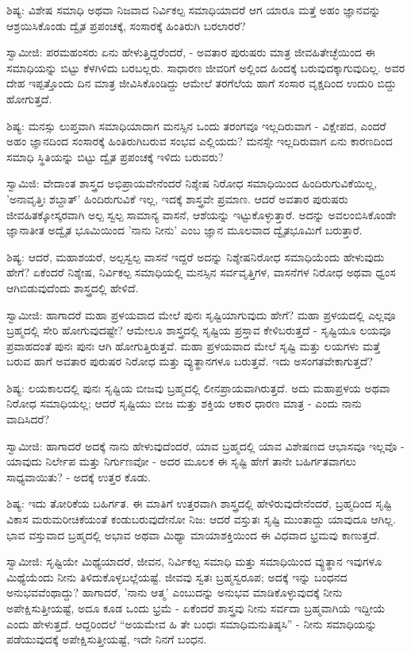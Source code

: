 ಶಿಷ್ಯ: ವಿಶೇಷ ಸಮಾಧಿ ಅಥವಾ ನಿಜವಾದ ನಿರ್ವಿಕಲ್ಪ ಸಮಾಧಿಯಾದರೆ ಆಗ ಯಾರೂ ಮತ್ತೆ ಅಹಂ ಜ್ಞಾನವನ್ನು ಆಶ್ರಯಿಸಿಕೊಂಡು ದ್ವೈತ ಪ್ರಪಂಚಕ್ಕೆ, ಸಂಸಾರಕ್ಕೆ ಹಿಂತಿರುಗಿ ಬರಲಾರರೆ?

ಸ್ವಾಮೀಜಿ: ಪರಮಹಂಸರು ಏನು ಹೇಳುತ್ತಿದ್ದರೆಂದರೆ, - ಅವತಾರ ಪುರುಷರು ಮಾತ್ರ ಜೀವಹಿತೇಚ್ಛೆಯಿಂದ ಈ ಸಮಾಧಿಯನ್ನು ಬಿಟ್ಟು ಕೆಳಗಿಳಿದು ಬರಬಲ್ಲರು. ಸಾಧಾರಣ ಜೀವರಿಗೆ ಅಲ್ಲಿಂದ ಹಿಂದಕ್ಕೆ ಬರುವುದಕ್ಕಾಗುವುದಿಲ್ಲ. ಅವರ ದೇಹ ಇಪ್ಪತ್ತೊಂದು ದಿನ ಮಾತ್ರ ಜೀವಿಸಿಕೊಂಡಿದ್ದು ಆಮೇಲೆ ತರಗೆಲೆಯ ಹಾಗೆ ಸಂಸಾರ ವೃಕ್ಷದಿಂದ ಉದುರಿ ಬಿದ್ದು ಹೋಗುತ್ತದೆ.

ಶಿಷ್ಯ: ಮನಸ್ಸು ಲುಪ್ತವಾಗಿ ಸಮಾಧಿಯಾದಾಗ ಮನಸ್ಸಿನ ಒಂದು ತರಂಗವೂ ಇಲ್ಲದಿರುವಾಗ - ವಿಕ್ಷೇಪದ, ಎಂದರೆ ಅಹಂ ಜ್ಞಾನದಿಂದ ಸಂಸಾರಕ್ಕೆ ಹಿಂತಿರುಗಿಬರುವ ಸಂಭವ ಎಲ್ಲಿಯದು? ಮನಸ್ಸೇ ಇಲ್ಲದಿರುವಾಗ ಏನು ಕಾರಣದಿಂದ ಸಮಾಧಿ ಸ್ಥಿತಿಯನ್ನು ಬಿಟ್ಟು ದ್ವೈತ ಪ್ರಪಂಚಕ್ಕೆ ಇಳಿದು ಬರುವರು?

ಸ್ವಾಮಿಜಿ: ವೇದಾಂತ ಶಾಸ್ತ್ರದ ಅಭಿಪ್ರಾಯವೇನೆಂದರೆ ನಿಶ್ಶೇಷ ನಿರೋಧ ಸಮಾಧಿಯಿಂದ ಹಿಂದಿರುಗುವಿಕೆಯಿಲ್ಲ, 'ಅನಾವೃತ್ತಿಃ ಶಬ್ದಾತ್' ಹಿಂದಿರುಗುವಿಕೆ ಇಲ್ಲ, ಇದಕ್ಕೆ ಶಾಸ್ತ್ರವೇ ಪ್ರಮಾಣ. ಆದರೆ ಅವತಾರ ಪುರುಷರು ಜೀವಹಿತಕ್ಕೋಸ್ಕರವಾಗಿ ಅಲ್ಪ ಸ್ವಲ್ಪ ಸಾಮಾನ್ಯ ವಾಸನೆ, ಆಶೆಯನ್ನು ಇಟ್ಟುಕೊಳ್ಳುತ್ತಾರೆ. ಅದನ್ನು ಅವಲಂಬಿಸಿಕೊಂಡೇ ಜ್ಞಾನಾತೀತ ಅದ್ವೈತ ಭೂಮಿಯಿಂದ 'ನಾನು ನೀನು' ಎಂಬ ಜ್ಞಾನ ಮೂಲವಾದ ದ್ವೈತಭೂಮಿಗೆ ಬರುತ್ತಾರೆ.

ಶಿಷ್ಯ: ಆದರೆ, ಮಹಾಶಯರೆ, ಅಲ್ಪಸ್ವಲ್ಪ ವಾಸನೆ ಇದ್ದರೆ ಅದನ್ನು ನಿಶ್ಶೇಷನಿರೋಧ ಸಮಾಧಿಯೆಂದು ಹೇಳುವುದು ಹೇಗೆ? ಏಕೆಂದರೆ ನಿಶ್ಶೇಷ, ನಿರ್ವಿಕಲ್ಪ ಸಮಾಧಿಯಲ್ಲಿ ಮನಸ್ಸಿನ ಸರ್ವವೃತ್ತಿಗಳ, ವಾಸನೆಗಳ ನಿರೋಧ ಅಥವಾ ಧ್ವಂಸ ಆಗಿಬಿಡುವುದೆಂದು ಶಾಸ್ತ್ರದಲ್ಲಿ ಹೇಳಿದೆ.

ಸ್ವಾಮೀಜಿ: ಹಾಗಾದರೆ ಮಹಾ ಪ್ರಳಯವಾದ ಮೇಲೆ ಪುನಃ ಸೃಷ್ಟಿಯಾಗುವುದು ಹೇಗೆ? ಮಹಾ ಪ್ರಳಯದಲ್ಲಿ ಎಲ್ಲವೂ ಬ್ರಹ್ಮದಲ್ಲಿ ಸೇರಿ ಹೋಗುವುದಷ್ಟೇ? ಆಮೇಲೂ ಶಾಸ್ತ್ರದಲ್ಲಿ ಸೃಷ್ಟಿಯ ಪ್ರಸ್ತಾವ ಕೇಳಿಬರುತ್ತದೆ - ಸೃಷ್ಟಿಯೂ ಲಯವೂ ಪ್ರವಾಹದಂತೆ ಪುನಃ ಪುನಃ ಆಗಿ ಹೋಗುತ್ತಿರುತ್ತವೆ. ಮಹಾ ಪ್ರಳಯವಾದ ಮೇಲೆ ಸೃಷ್ಟಿ ಮತ್ತು ಲಯಗಳು ಮತ್ತೆ ಬರುವ ಹಾಗೆ ಅವತಾರ ಪುರುಷರ ನಿರೋಧ ಮತ್ತು ವ್ಯುತ್ಥಾನಗಳೂ ಬರುತ್ತವೆ. ಇದು ಅಸಂಗತವೇಕಾಗುತ್ತದೆ?

ಶಿಷ್ಯ: ಲಯಕಾಲದಲ್ಲಿ ಪುನಃ ಸೃಷ್ಟಿಯ ಬೀಜವು ಬ್ರಹ್ಮದಲ್ಲಿ ಲೀನಪ್ರಾಯವಾಗಿರುತ್ತದೆ. ಅದು ಮಹಾಪ್ರಳಯ ಅಥವಾ ನಿರೋಧ ಸಮಾಧಿಯಲ್ಲ; ಆದರೆ ಸೃಷ್ಟಿಯು ಬೀಜ ಮತ್ತು ಶಕ್ತಿಯ ಆಕಾರ ಧಾರಣ ಮಾತ್ರ - ಎಂದು ನಾನು ವಾದಿಸಿದರೆ?

ಸ್ವಾಮೀಜಿ: ಹಾಗಾದರೆ ಅದಕ್ಕೆ ನಾನು ಹೇಳುವುದೆಂದರೆ, ಯಾವ ಬ್ರಹ್ಮದಲ್ಲಿ ಯಾವ ವಿಶೇಷಣದ ಆಭಾಸವೂ ಇಲ್ಲವೊ - ಯಾವುದು ನಿರ್ಲೇಪ ಮತ್ತು ನಿರ್ಗುಣವೋ - ಅದರ ಮೂಲಕ ಈ ಸೃಷ್ಟಿ ಹೇಗೆ ತಾನೇ ಬಹಿರ್ಗತವಾಗಲು ಸಾಧ್ಯವಾಯಿತು? - ಅದಕ್ಕೆ ಉತ್ತರ ಕೊಡು.

ಶಿಷ್ಯ: ಇದು ತೋರಿಕೆಯ ಬಹಿರ್ಗತ. ಈ ಮಾತಿಗೆ ಉತ್ತರವಾಗಿ ಶಾಸ್ತ್ರದಲ್ಲಿ ಹೇಳಿರುವುದೇನೆಂದರೆ, ಬ್ರಹ್ಮದಿಂದ ಸೃಷ್ಟಿ ವಿಕಾಸ ಮರುಮರೀಚಿಕೆಯಂತೆ ಕಂಡುಬರುವುದೇನೋ ನಿಜ: ಆದರೆ ವಸ್ತುತಃ ಸೃಷ್ಟಿ ಮುಂತಾದ್ದು ಯಾವುದೂ ಆಗಿಲ್ಲ. ಭಾವ ವಸ್ತುವಾದ ಬ್ರಹ್ಮದಲ್ಲಿ ಅಭಾವ ಅಥವಾ ಮಿಥ್ಯಾ ಮಾಯಾಶಕ್ತಿಯಿಂದ ಈ ವಿಧವಾದ ಭ್ರಮವು ಕಾಣುತ್ತದೆ.

ಸ್ವಾಮೀಜಿ: ಸೃಷ್ಟಿಯೇ ಮಿಥ್ಯೆಯಾದರೆ, ಜೀವನ, ನಿರ್ವಿಕಲ್ಪ ಸಮಾಧಿ ಮತ್ತು ಸಮಾಧಿಯಿಂದ ವ್ಯುತ್ಥಾನ ಇವುಗಳೂ ಮಿಥ್ಯೆಯೆಂದು ನೀನು ತಿಳಿದುಕೊಳ್ಳಬಲ್ಲೆಯಷ್ಟೆ. ಜೀವವು ಸ್ವತಃ ಬ್ರಹ್ಮಸ್ವರೂಪ; ಅದಕ್ಕೆ ಇನ್ನು ಬಂಧನದ ಅನುಭವವೆಂಥಾದ್ದು? ಹಾಗಾದರೆ, 'ನಾನು ಆತ್ಮ' ಎಂಬುದನ್ನು ಅನುಭವ ಮಾಡಿಕೊಳ್ಳುವುದಕ್ಕೆ ನೀನು ಅಪೇಕ್ಷಿಸುತ್ತೀಯಷ್ಟೆ, ಅದೂ ಕೂಡ ಒಂದು ಭ್ರಮೆ - ಏಕೆಂದರೆ ಶಾಸ್ತ್ರವು ನೀನು ಸರ್ವದಾ ಬ್ರಹ್ಮವಾಗಿಯೆ ಇದ್ದೀಯೆ ಎಂದು ಹೇಳುತ್ತದೆ. ಆದ್ದರಿಂದಲೆ “ಅಯಮೇವ ಹಿ ತೇ ಬಂಧಃ ಸಮಾಧಿಮನುತಿಷ್ಠಸಿ” - ನೀನು ಸಮಾಧಿಯನ್ನು ಪಡೆಯುವುದಕ್ಕೆ ಅಪೇಕ್ಷಿಸುತ್ತೀಯಷ್ಟೆ, ಇದೇ ನಿನಗೆ ಬಂಧನ.

